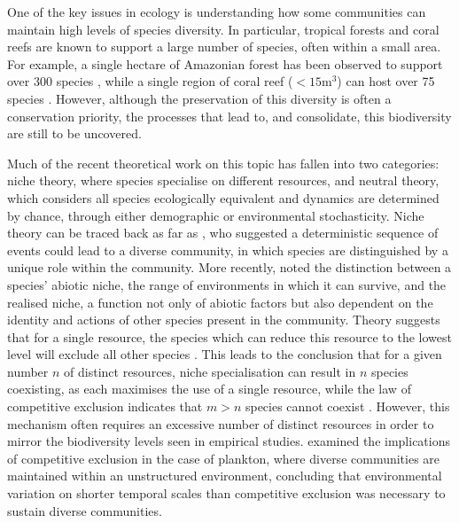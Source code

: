One of the key issues in ecology is understanding how some communities can maintain high levels of species diversity. In particular, tropical forests and coral reefs are known to support a large number of species, often within a small area. For example, a single hectare of Amazonian forest has been observed to support over 300 species \citep{valencia1994high}, while a single region of coral reef ($<15$m$^3$) can host over 75 species \citep{smith1972space}. However, although the preservation of this diversity is often a conservation priority, the processes that lead to, and consolidate, this biodiversity are still to be uncovered.

Much of the recent theoretical work on this topic has fallen into two categories: niche theory, where species specialise on different resources, and neutral theory, which considers all species ecologically equivalent and dynamics are determined by chance, through either demographic or environmental stochasticity. Niche theory can be traced back as far as \cite{darwinorigin}, who suggested a deterministic sequence of events could lead to a diverse community, in which species are distinguished by a unique role within the community. More recently, \cite{hutchinson1957concluding} noted the distinction between a species' abiotic niche, the range of environments in which it can survive, and the realised niche, a function not only of abiotic factors but also dependent on the identity and actions of other species present in the community. Theory suggests that for a single resource, the species which can reduce this resource to the lowest level will exclude all other species \citep[e.g.][]{tilman1980resources,tilman1991dynamics}. This leads to the conclusion that for a given number $n$ of distinct resources, niche specialisation can result in $n$ species coexisting, as each maximises the use of a single resource, while the law of competitive exclusion indicates that $m>n$ species cannot coexist \citep{hardin1960competitive}. However, this mechanism often requires an excessive number of distinct resources in order to mirror the biodiversity levels seen in empirical studies. \cite{hutchinson1961paradox} examined the implications of competitive exclusion in the case of plankton, where diverse communities are maintained within an unstructured environment, concluding that environmental variation on shorter temporal scales than competitive exclusion was necessary to sustain diverse communities.

